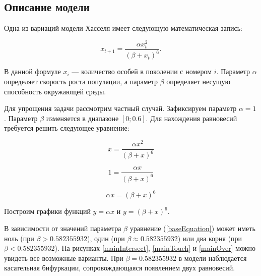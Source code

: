 \subsection{Описание модели}

    Одна из вариаций модели Хасселя \cite{densityDependenceInSingleSpeciesPopulations} имеет следующую математическая запись:

    \begin{equation}
        \label{origin}
        x_{t+1} = \frac{\alpha x_t^2}{(\beta + x_t)^6}.
    \end{equation}

    В данной формуле \(x_i\) --- количество особей в поколении с номером \(i\). Параметр \(\alpha\) определяет скорость роста популяции, а параметр \(\beta\) определяет несущую способность окружающей среды.
    
    Для упрощения задачи рассмотрим частный случай. Зафиксируем параметр \(\alpha = 1\). Параметр \(\beta\) изменяется в диапазоне \([0; 0.6]\). Для нахождения равновесий требуется решить следующее уравнение:  

    \[x = \frac{\alpha x^2}{(\beta + x)^6}\]
    
    \[1 = \frac{\alpha x}{(\beta + x)^6}\]

    \begin{equation}
        \label{baseEquation}
        \alpha x = (\beta + x)^6
    \end{equation}

    Построим графики функций \(y = \alpha x\) и \(y = (\beta + x)^6\). 
        
    В зависимости от значений параметра \(\beta\) уравнение (\ref{baseEquation}) может иметь ноль (при \(\beta > 0.582355932\)), один (при \(\beta \approx 0.582355932\)) или два корня (при \(\beta < 0.582355932\)). На рисунках \ref{mainIntersect}, \ref{mainTouch} и \ref{mainOver} можно увидеть все возможные варианты. При \(\beta=0.582355932\) в модели наблюдается касательная бифуркации, сопровождающаяся появлением двух равновесий.

